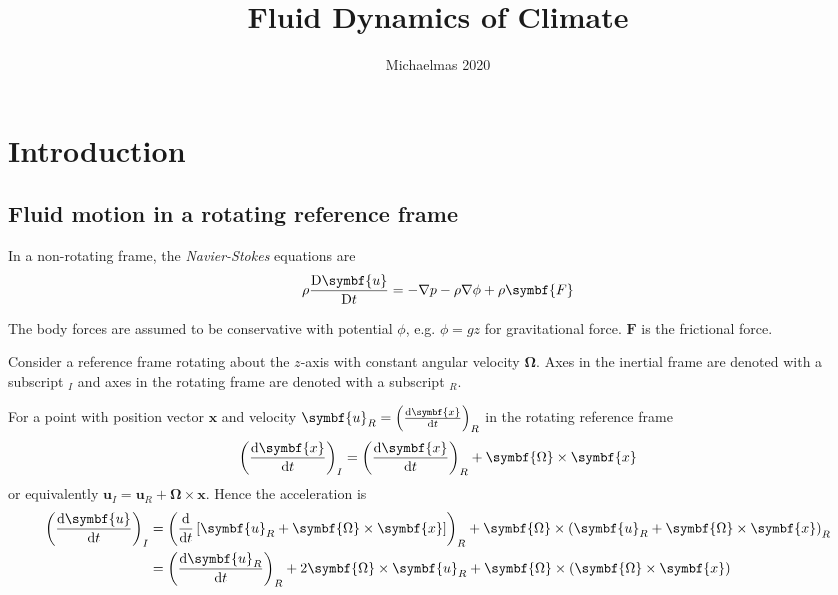 \documentclass{jknotes}
\begin{document}
\title{Fluid Dynamics of Climate}
\date{Michaelmas 2020}

\maketitle
\suggestionsspiel
\tableofcontents

\section{Introduction}
\subsection{Fluid motion in a rotating reference frame}
In a non-rotating frame, the \emph{Navier-Stokes} equations are
\begin{equation}
	\rho \frac{\diffD \symbf{u}}{\diffD t} = -\nabla p - \rho \nabla \phi + \rho
	\symbf{F}
	\label{ns}
\end{equation}

The body forces are assumed to be conservative with potential $\phi$, e.g.
$\phi = gz$ for gravitational force. $\symbf{F}$ is the frictional force.

Consider a reference frame rotating about the $z$-axis with constant angular
velocity $\symbf{\Omega}$. Axes in the inertial frame are denoted with a
subscript $_I$ and axes in the rotating frame are denoted with a subscript
$_R$.

\begin{center}

\end{center}

For a point with position vector $\symbf{x}$ and velocity $\symbf{u}_R =
\left(\frac{\diffd \symbf{x}}{\diffd t}\right)_R$ in the rotating reference
frame
\begin{equation}
	\left(\frac{\diffd \symbf{x}}{\diffd t}\right)_I = 
	\left(\frac{\diffd \symbf{x}}{\diffd t}\right)_R + \symbf{\Omega} \times \symbf{x}
\end{equation}
or equivalently $\symbf{u}_I = \symbf{u}_R + \symbf{\Omega} \times \symbf{x}$. Hence the
acceleration is
\begin{equation}
	\begin{aligned}
		\left(\frac{\diffd \symbf{u}}{\diffd t}\right)_I &= 
	\left(\frac{\diffd}{\diffd t}\left[ \symbf{u}_R + \symbf{\Omega} \times \symbf{x}
			\right]\right)_R + \symbf{\Omega} \times \left( \symbf{u}_R +
		\symbf{\Omega} \times \symbf{x}\right)_R \\
		&= \left(\frac{\diffd \symbf{u}_R}{\diffd t}\right)_R + 2 \symbf{\Omega}
		\times \symbf{u}_R + \symbf{\Omega} \times \left( \symbf{\Omega} \times
		\symbf{x}\right)
	\end{aligned}
\end{equation}
\end{document}
